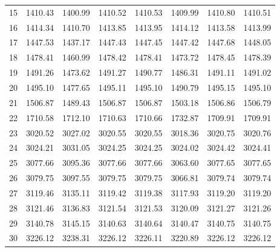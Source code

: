 \documentclass[10pt,oneside]{article}
\begin{document}
\begin{table}[h!]
\begin{tabular}{cccccccc}
15 &   1410.43 & 1400.99 & 1410.52 &    1410.53 &      1409.99 & 1410.80 &   1410.51 \\
16 &   1414.34 & 1410.70 & 1413.85 &    1413.95 &      1414.12 & 1413.58 &   1413.99 \\
17 &   1447.53 & 1437.17 & 1447.43 &    1447.45 &      1447.42 & 1447.68 &   1448.05 \\
18 &   1478.41 & 1460.99 & 1478.42 &    1478.41 &      1473.72 & 1478.45 &   1478.39 \\
19 &   1491.26 & 1473.62 & 1491.27 &    1490.77 &      1486.31 & 1491.11 &   1491.02 \\
20 &   1495.10 & 1477.65 & 1495.11 &    1495.10 &      1490.79 & 1495.15 &   1495.10 \\
21 &   1506.87 & 1489.43 & 1506.87 &    1506.87 &      1503.18 & 1506.86 &   1506.79 \\
22 &   1710.58 & 1712.10 & 1710.63 &    1710.66 &      1732.87 & 1709.91 &   1709.91 \\
23 &   3020.52 & 3027.02 & 3020.55 &    3020.55 &      3018.36 & 3020.75 &   3020.76 \\
24 &   3024.21 & 3031.05 & 3024.25 &    3024.25 &      3024.02 & 3024.42 &   3024.41 \\
25 &   3077.66 & 3095.36 & 3077.66 &    3077.66 &      3063.60 & 3077.65 &   3077.65 \\
26 &   3079.75 & 3097.55 & 3079.75 &    3079.75 &      3066.81 & 3079.74 &   3079.74 \\
27 &   3119.46 & 3135.11 & 3119.42 &    3119.38 &      3117.93 & 3119.20 &   3119.20 \\
28 &   3121.46 & 3136.83 & 3121.54 &    3121.53 &      3120.09 & 3121.27 &   3121.26 \\
29 &   3140.78 & 3145.15 & 3140.63 &    3140.64 &      3140.47 & 3140.75 &   3140.75 \\
30 &   3226.12 & 3238.31 & 3226.12 &    3226.11 &      3220.89 & 3226.12 &   3226.12 \\
\bottomrule
\end{tabular}
\end{table}
\end{document}
